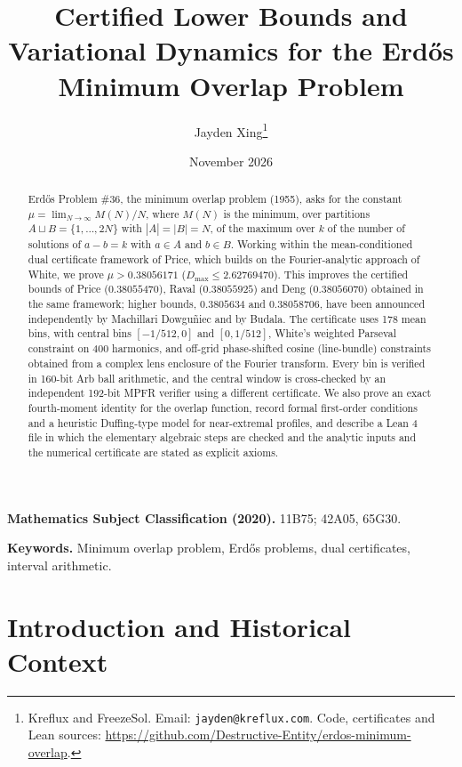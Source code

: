 \documentclass[11pt,a4paper]{article}
\title{Certified Lower Bounds and Variational Dynamics for the Erd\H{o}s Minimum Overlap Problem}
\author{
  Jayden Xing\thanks{Kreflux and FreezeSol. Email: \texttt{jayden@kreflux.com}. Code, certificates and Lean sources: \url{https://github.com/Destructive-Entity/erdos-minimum-overlap}.}
}
\date{November 2026}
\theoremstyle{definition}
\theoremstyle{remark}
\begin{document}
\maketitle

\begin{abstract}
Erd\H{o}s Problem \#36, the minimum overlap problem (1955), asks for the constant $\mu = \lim_{N \to \infty} M(N)/N$, where $M(N)$ is the minimum, over partitions $A \sqcup B = \{1, \dots, 2N\}$ with $|A| = |B| = N$, of the maximum over $k$ of the number of solutions of $a - b = k$ with $a \in A$ and $b \in B$. Working within the mean-conditioned dual certificate framework of Price, which builds on the Fourier-analytic approach of White, we prove $\mu > 0.38056171$ ($D_{\max} \le 2.62769470$). This improves the certified bounds of Price ($0.38055470$), Raval ($0.38055925$) and Deng ($0.38056070$) obtained in the same framework; higher bounds, $0.3805634$ and $0.38058706$, have been announced independently by Machillari Dowgu\~{n}iec and by Budala. The certificate uses 178 mean bins, with central bins $[-1/512,0]$ and $[0,1/512]$, White's weighted Parseval constraint on 400 harmonics, and off-grid phase-shifted cosine (line-bundle) constraints obtained from a complex lens enclosure of the Fourier transform. Every bin is verified in 160-bit Arb ball arithmetic, and the central window is cross-checked by an independent 192-bit MPFR verifier using a different certificate. We also prove an exact fourth-moment identity for the overlap function, record formal first-order conditions and a heuristic Duffing-type model for near-extremal profiles, and describe a Lean 4 file in which the elementary algebraic steps are checked and the analytic inputs and the numerical certificate are stated as explicit axioms.
\end{abstract}

\medskip
\noindent\textbf{Mathematics Subject Classification (2020).} 11B75; 42A05, 65G30.

\noindent\textbf{Keywords.} Minimum overlap problem, Erd\H{o}s problems, dual certificates, interval arithmetic.

\section{Introduction and Historical Context}
\end{document}
